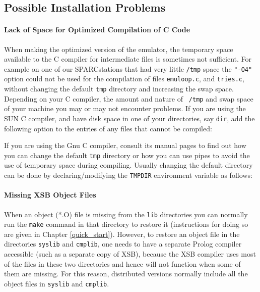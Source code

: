 \subsection{Possible Installation Problems}

\paragraph*{Lack of Space for Optimized Compilation of C Code}
When making the optimized version of the emulator, the temporary space
available to the C compiler for intermediate files is sometimes not
sufficient. For example on one of our SPARCstations that had very
little {\tt /tmp} space the {\tt "-O4"} option could not be used for
the compilation of files {\tt emuloop.c}, and {\tt tries.c}, without
changing the default {\tt tmp} directory and increasing the swap
space.  Depending on your C compiler, the amount and nature of {\tt
/tmp} and swap space of your machine you may or may not encounter
problems.  If you are using the SUN C compiler, and have disk space in
one of your directories, say {\tt dir}, add the following option to
the entries of any files that cannot be compiled:


\noindent
If you are using the Gnu C compiler, consult its manual pages
to find out how you can change the default {\tt tmp} directory or how you
can use pipes to avoid the use of temporary space during compiling.
Usually changing the default directory can be done by declaring/modifying
the {\tt TMPDIR} environment variable as follows:


\paragraph*{Missing XSB Object Files}
When an object (*.O) file is missing from the {\tt lib} directories you can
normally run the {\tt make} command  in that directory to restore it
(instructions for doing so are given in Chapter
\ref{quick_start}).  However, to restore an object file in the
directories {\tt syslib} and {\tt cmplib}, one needs to have a
separate Prolog compiler accessible (such as a separate copy of
XSB), because the XSB compiler uses most of the files in these
two directories and hence will not function when some of them are
missing.  For this reason, distributed versions normally include all
the object files in {\tt syslib} and {\tt cmplib}.



